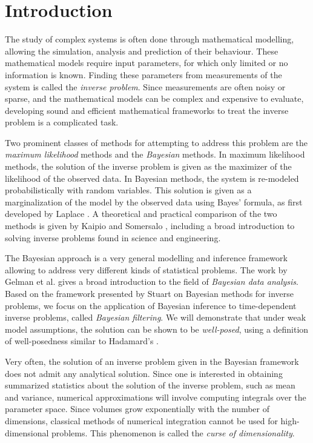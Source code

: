 \section{Introduction}
\setcounter{page}{1}
\thispagestyle{empty}

The study of complex systems is often done through mathematical modelling, allowing the simulation, analysis and prediction of their behaviour. These mathematical models require input parameters, for which only limited or no information is known. Finding these parameters from measurements of the system is called the \textit{inverse problem}. Since measurements are often noisy or sparse, and the mathematical models can be complex and expensive to evaluate, developing sound and efficient mathematical frameworks to treat the inverse problem is a complicated task.

Two prominent classes of methods for attempting to address this problem are the \textit{maximum likelihood} methods and the \textit{Bayesian} methods. In maximum likelihood methods, the solution of the inverse problem is given as the maximizer of the likelihood of the observed data. In Bayesian methods, the system is re-modeled probabilistically with random variables. This solution is given as a marginalization of the model by the observed data using Bayes' formula, as first developed by Laplace \cite{laplace1820theorie}. A theoretical and practical comparison of the two methods is given by Kaipio and Somersalo \cite{kaipio2006statistical}, including a broad introduction to solving inverse problems found in science and engineering. 

The Bayesian approach is a very general modelling and inference framework allowing to address very different kinds of statistical problems. The work by Gelman et al. \cite{gelman} gives a broad introduction to the field of \textit{Bayesian data analysis}. Based on the framework presented by Stuart \cite{stuart_2010} on Bayesian methods for inverse problems, we focus on the application of Bayesian inference to time-dependent inverse problems, called \textit{Bayesian filtering}. We will demonstrate that under weak model assumptions, the solution can be shown to be \textit{well-posed}, using a definition of well-posedness similar to Hadamard's \cite{hadamard}.

Very often, the solution of an inverse problem given in the Bayesian framework does not admit any analytical solution. Since one is interested in obtaining summarized statistics about the solution of the inverse problem, such as mean and variance, numerical approximations will involve computing integrals over the parameter space. Since volumes grow exponentially with the number of dimensions, classical methods of numerical integration cannot be used for high-dimensional problems. This phenomenon is called the \textit{curse of dimensionality}.

